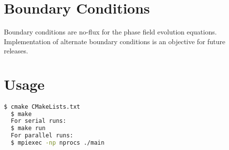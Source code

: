\documentclass[11pt]{article}
\begin{document}

\section{Boundary Conditions}
\paragraph{}
Boundary conditions are no-flux for the phase field evolution equations.  Implementation of alternate boundary conditions is an objective for future releases.

\section{Usage}
\paragraph{}
\noindent
\begin{lstlisting}[language=bash]
  $ cmake CMakeLists.txt
  $ make
  For serial runs:
  $ make run
  For parallel runs:
  $ mpiexec -np nprocs ./main
\end{lstlisting}
\end{document}
